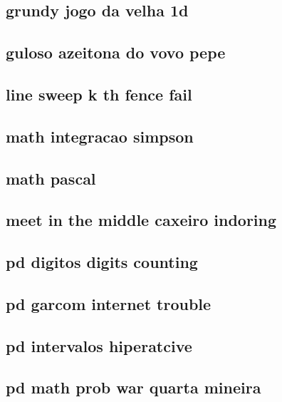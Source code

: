 \subsection{grundy jogo da velha 1d}
\raggedbottom
\clearpage
\subsection{guloso azeitona do vovo pepe}
\raggedbottom
\clearpage
\subsection{line sweep k th fence fail}
\raggedbottom
\clearpage
\subsection{math integracao simpson}
\raggedbottom
\clearpage
\subsection{math pascal}
\raggedbottom
\clearpage
\subsection{meet in the middle caxeiro indoring}
\raggedbottom
\clearpage
\subsection{pd digitos digits counting}
\raggedbottom
\clearpage
\subsection{pd garcom internet trouble}
\raggedbottom
\clearpage
\subsection{pd intervalos hiperatcive}
\raggedbottom
\clearpage
\subsection{pd math prob war quarta mineira}
\raggedbottom
\clearpage
